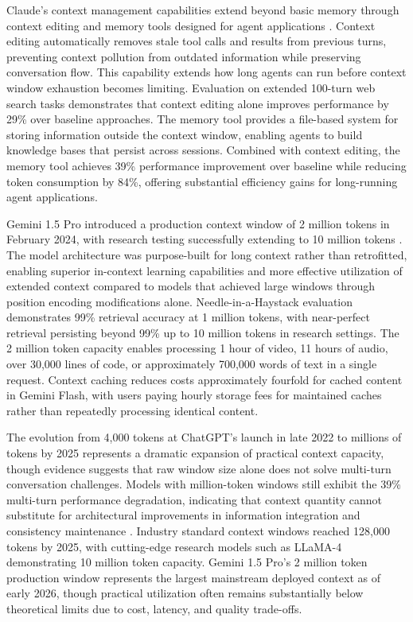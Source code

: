 \documentclass[11pt,letterpaper]{article}
\begin{document}
Claude's context management capabilities extend beyond basic memory through context editing and memory tools designed for agent applications \cite{anthropic2024context}. Context editing automatically removes stale tool calls and results from previous turns, preventing context pollution from outdated information while preserving conversation flow. This capability extends how long agents can run before context window exhaustion becomes limiting. Evaluation on extended 100-turn web search tasks demonstrates that context editing alone improves performance by 29\% over baseline approaches. The memory tool provides a file-based system for storing information outside the context window, enabling agents to build knowledge bases that persist across sessions. Combined with context editing, the memory tool achieves 39\% performance improvement over baseline while reducing token consumption by 84\%, offering substantial efficiency gains for long-running agent applications.

Gemini 1.5 Pro introduced a production context window of 2 million tokens in February 2024, with research testing successfully extending to 10 million tokens \cite{google2024gemini}. The model architecture was purpose-built for long context rather than retrofitted, enabling superior in-context learning capabilities and more effective utilization of extended context compared to models that achieved large windows through position encoding modifications alone. Needle-in-a-Haystack evaluation demonstrates 99\% retrieval accuracy at 1 million tokens, with near-perfect retrieval persisting beyond 99\% up to 10 million tokens in research settings. The 2 million token capacity enables processing 1 hour of video, 11 hours of audio, over 30,000 lines of code, or approximately 700,000 words of text in a single request. Context caching reduces costs approximately fourfold for cached content in Gemini Flash, with users paying hourly storage fees for maintained caches rather than repeatedly processing identical content.

The evolution from 4,000 tokens at ChatGPT's launch in late 2022 to millions of tokens by 2025 represents a dramatic expansion of practical context capacity, though evidence suggests that raw window size alone does not solve multi-turn conversation challenges. Models with million-token windows still exhibit the 39\% multi-turn performance degradation, indicating that context quantity cannot substitute for architectural improvements in information integration and consistency maintenance \cite{wang2025survey}. Industry standard context windows reached 128,000 tokens by 2025, with cutting-edge research models such as LLaMA-4 demonstrating 10 million token capacity. Gemini 1.5 Pro's 2 million token production window represents the largest mainstream deployed context as of early 2026, though practical utilization often remains substantially below theoretical limits due to cost, latency, and quality trade-offs.
\end{document}
